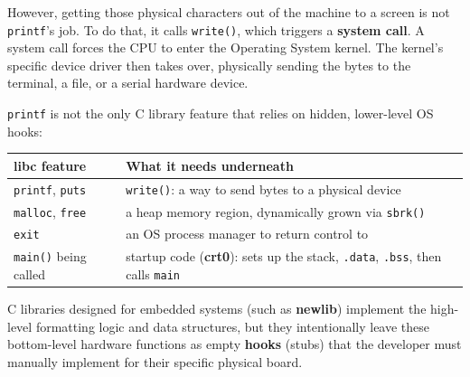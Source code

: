 However, getting those physical characters out of the machine to a screen is not \texttt{printf}'s job. To do that, it calls \texttt{write()}, which triggers a \textbf{system call}. A system call forces the CPU to enter the Operating System kernel. The kernel's specific device driver then takes over, physically sending the bytes to the terminal, a file, or a serial hardware device.

\texttt{printf} is not the only C library feature that relies on hidden, lower-level OS hooks:

\begin{table}[h!]
    \centering
    \begin{tabular}{|l|l|}
        \hline
        \textbf{libc feature} & \textbf{What it needs underneath} \\ \hline
        \texttt{printf}, \texttt{puts} & \texttt{write()}: a way to send bytes to a physical device \\ \hline
        \texttt{malloc}, \texttt{free} & a heap memory region, dynamically grown via \texttt{sbrk()} \\ \hline
        \texttt{exit} & an OS process manager to return control to \\ \hline
        \texttt{main()} being called & startup code (\textbf{crt0}): sets up the stack, \texttt{.data}, \texttt{.bss}, then calls \texttt{main} \\ \hline
    \end{tabular}
\end{table}

C libraries designed for embedded systems (such as \textbf{newlib}) implement the high-level formatting logic and data structures, but they intentionally leave these bottom-level hardware functions as empty \textbf{hooks} (stubs) that the developer must manually implement for their specific physical board.

